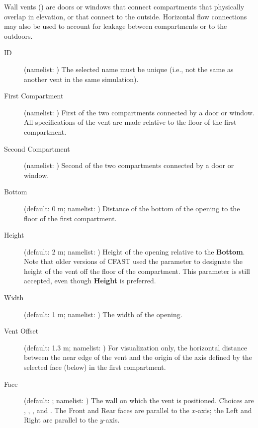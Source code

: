 Wall vents () are doors or windows that connect compartments that physically overlap in elevation, or that connect to the outside. Horizontal flow connections may also be used to account for leakage between compartments or to the outdoors.
\begin{description}
\item[ID] (namelist: ) The selected name must be unique (i.e., not the same as another vent in the same simulation).
\item[First Compartment] (namelist: ) First of the two compartments connected by a door or window. All specifications of the vent are made relative to the floor of the first compartment.
\item[Second Compartment] (namelist: ) Second of the two compartments connected by a door or window.
\item[Bottom] (default: 0 m; namelist: ) Distance of the bottom of the opening to the floor of the first compartment.
\item[Height] (default: 2 m; namelist: ) Height of the opening relative to the \textbf{Bottom}. Note that older versions of CFAST used the parameter  to designate the height of the vent off the floor of the compartment. This parameter is still accepted, even though \textbf{Height} is preferred.
\item[Width] (default: 1 m; namelist: ) The width of the opening.
\item[Vent Offset] (default: 1.3 m; namelist: ) For visualization only, the horizontal distance between the near edge of the vent and the origin of the axis defined by the selected face (below) in the first compartment.
\item[Face] (default: ; namelist: ) The wall on which the vent is positioned.  Choices are , , , and . The Front and Rear faces are parallel to the $x$-axis; the Left and Right are parallel to the $y$-axis.
\end{description}
